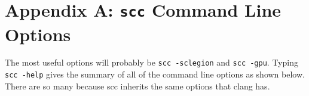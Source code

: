 \let\clearforchapter\par %

\appendix

\chapter*{Appendix A:  \texttt{scc} Command Line Options}
\label{app-scc}

The most useful options will probably be \texttt{scc -sclegion} and \texttt{scc -gpu}.
Typing \texttt{scc -help} gives the summary of all of the command line options as shown below.  There are so many because scc inherits the same options that clang has.

\par\bigskip
